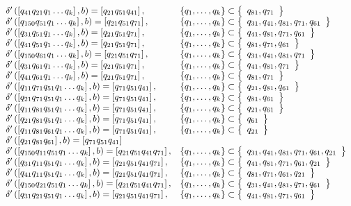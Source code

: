 \begin{align*}
\begin{array}{ll}
		\gendelta{q_{41}q_{21}}{b}{q_{21}q_{51}q_{41}}{q_{81},q_{71}}                                          \\
		\gendelta{q_{150}q_{51}}{b}{q_{21}q_{51}q_{71}}{q_{31},q_{41},q_{81},q_{71},q_{61}}                    \\
		\gendelta{q_{31}q_{51}}{b}{q_{21}q_{51}q_{71}}{q_{41},q_{81},q_{71},q_{61}}                            \\
		\gendelta{q_{41}q_{51}}{b}{q_{21}q_{51}q_{71}}{q_{81},q_{71},q_{61}}                                   \\
		\gendelta{q_{150}q_{61}}{b}{q_{21}q_{51}q_{71}}{q_{31},q_{41},q_{81},q_{71}}                           \\
		\gendelta{q_{31}q_{61}}{b}{q_{21}q_{51}q_{71}}{q_{41},q_{81},q_{71}}                                   \\
		\gendelta{q_{41}q_{61}}{b}{q_{21}q_{51}q_{71}}{q_{81},q_{71}}                                          \\
		\gendelta{q_{11}q_{71}q_{51}}{b}{q_{71}q_{51}q_{41}}{q_{21},q_{81},q_{61}}                             \\
		\gendelta{q_{21}q_{71}q_{51}}{b}{q_{71}q_{51}q_{41}}{q_{81},q_{61}}                                    \\
		\gendelta{q_{11}q_{81}q_{51}}{b}{q_{71}q_{51}q_{41}}{q_{21},q_{61}}                                    \\
		\gendelta{q_{21}q_{81}q_{51}}{b}{q_{71}q_{51}q_{41}}{q_{61}}                                           \\
		\gendelta{q_{11}q_{81}q_{61}}{b}{q_{71}q_{51}q_{41}}{q_{21}}                                           \\
		\gendelta{q_{21}q_{81}q_{61}}{b}{q_{71}q_{51}q_{41}}{}                                                 \\
		\gendelta{q_{150}q_{11}q_{51}}{b}{q_{21}q_{51}q_{41}q_{71}}{q_{31},q_{41},q_{81},q_{71},q_{61},q_{21}} \\
		\gendelta{q_{31}q_{11}q_{51}}{b}{q_{21}q_{51}q_{41}q_{71}}{q_{41},q_{81},q_{71},q_{61},q_{21}}         \\
		\gendelta{q_{41}q_{11}q_{51}}{b}{q_{21}q_{51}q_{41}q_{71}}{q_{81},q_{71},q_{61},q_{21}}                \\
		\gendelta{q_{150}q_{21}q_{51}}{b}{q_{21}q_{51}q_{41}q_{71}}{q_{31},q_{41},q_{81},q_{71},q_{61}}        \\
		\gendelta{q_{31}q_{21}q_{51}}{b}{q_{21}q_{51}q_{41}q_{71}}{q_{41},q_{81},q_{71},q_{61}}                \\

\end{array}
\end{align*}
